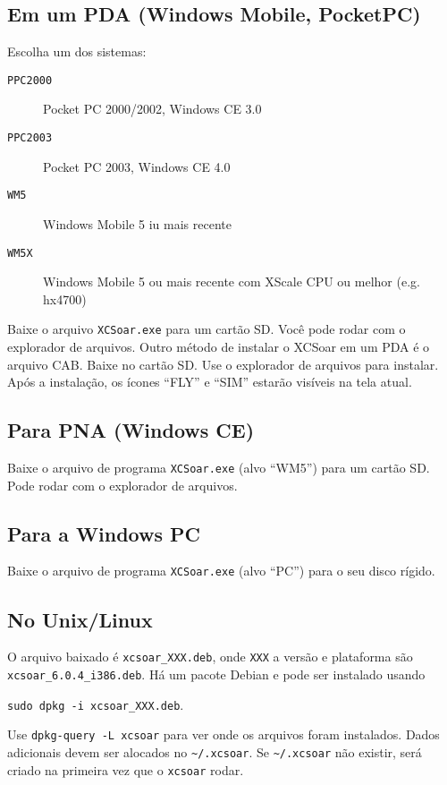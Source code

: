 \subsection*{Em um PDA (Windows Mobile, PocketPC)}

Escolha um dos sistemas:

\begin{description}
\item[\texttt{PPC2000}] Pocket PC 2000/2002, Windows CE 3.0
\item[\texttt{PPC2003}] Pocket PC 2003, Windows CE 4.0
\item[\texttt{WM5}] Windows Mobile 5 iu mais recente
\item[\texttt{WM5X}] Windows Mobile 5 ou mais recente com  XScale CPU ou melhor (e.g. hx4700)
\end{description}

Baixe o arquivo \verb|XCSoar.exe| para um cartão SD.  Você pode  rodar com o explorador de arquivos.
Outro método de instalar o XCSoar em um PDA é o arquivo CAB.  Baixe no cartão SD.  Use o explorador de arquivos para instalar.  Após a instalação, os ícones “FLY” e “SIM” estarão visíveis na tela atual.


\subsection*{Para PNA (Windows CE)}

Baixe o arquivo de programa \verb|XCSoar.exe| (alvo ``WM5'') para um cartão SD.  Pode rodar com o explorador de arquivos.

\subsection*{Para a Windows PC}

Baixe o arquivo de programa \verb|XCSoar.exe| (alvo ``PC'') para o seu disco rígido.

\subsection*{No Unix/Linux}

O arquivo baixado é \verb|xcsoar_XXX.deb|, onde \verb|XXX| a versão e plataforma são \verb|xcsoar_6.0.4_i386.deb|.
Há um pacote Debian e pode ser instalado usando
\begin{center}
\verb|sudo dpkg -i xcsoar_XXX.deb|.
\end{center}
Use \verb|dpkg-query -L xcsoar| para ver onde os arquivos foram instalados.  Dados adicionais devem ser alocados no \verb|~/.xcsoar|.
Se \verb|~/.xcsoar| não existir, será criado na primeira vez que o \verb|xcsoar| rodar.

